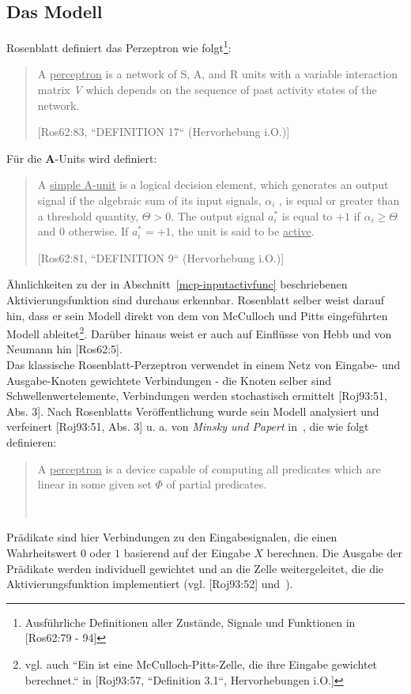 \subsection{Das Modell}

Rosenblatt definiert das Perzeptron wie folgt\footnote{
    Ausführliche Definitionen aller Zustände, Signale und Funktionen in [Ros62:79 - 94]
}:

\blockquote[{[Ros62:83, ``DEFINITION 17`` (Hervorhebung i.O.)]}]{
    A \underline{perceptron} is a network of S, A, and R units with a variable interaction matrix \textit{V} which depends on the
    sequence of past activity states of the network.
}

Für die \textbf{A}-Units wird definiert:

\blockquote[{[Ros62:81, ``DEFINITION 9`` (Hervorhebung i.O.)]}]{
    A \underline{simple A-unit} is a logical decision element, which
    generates an output signal if the algebraic sum of its
    input signals, $\alpha_i$ , is equal or greater than a threshold
    quantity, $\Theta > 0$. The output signal $a^*_i$ is equal to $+1$ if $\alpha_i \geq \Theta$ and $0$ otherwise. If $a^*_i = +1$,
    the unit is said to be \underline{active}.
}


Ähnlichkeiten zu der in Abschnitt~\ref{mcp-inputactivfunc} beschriebenen Aktivierungsfunktion sind durchaus erkennbar.
Rosenblatt selber weist darauf hin, dass er sein Modell direkt von dem von McCulloch und Pitts eingeführten Modell ableitet\footnote{
    vgl. auch ``Ein  ist eine McCulloch-Pitts-Zelle, die ihre Eingabe gewichtet berechnet.`` in [Roj93:57, ``Definition 3.1``, Hervorhebungen i.O.]
}. Darüber hinaus weist er auch auf Einflüsse von Hebb und von Neumann hin [Ros62:5].\\


Das klassische Rosenblatt-Perzeptron verwendet in einem Netz von Eingabe- und Ausgabe-Knoten gewichtete Verbindungen - die Knoten selber sind Schwellenwertelemente, Verbindungen werden stochastisch ermittelt [Roj93:51, Abs. 3].
Nach Rosenblatts Veröffentlichung wurde sein Modell analysiert und verfeinert [Roj93:51, Abs. 3] u. a. von \textit{Minsky und Papert} in~\cite{MP88}, die wie folgt definieren:

\blockquote[{~\cite[12, Hervorhebung i.O.]{MP88}}]{
    A \underline{perceptron} is a device capable of computing all predicates which are linear in some given set $\Phi$ of partial predicates.
}

Prädikate sind hier Verbindungen zu den Eingabesignalen, die einen Wahrheitswert $0$ oder $1$ basierend auf der Eingabe $X$ berechnen.
Die Ausgabe der Prädikate werden individuell gewichtet und an die Zelle weitergeleitet, die die Aktivierungsfunktion implementiert (vgl. [Roj93:52] und~\cite[8-12]{MP88}).


